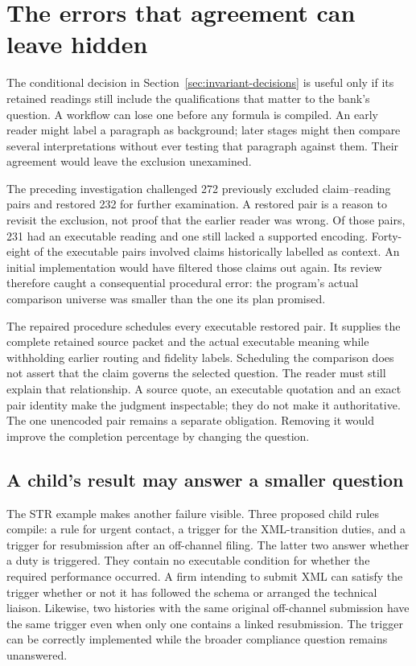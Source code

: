 
\section{The errors that agreement can leave hidden}
\label{sec:executed-assurance}

The conditional decision in Section~\ref{sec:invariant-decisions} is useful only
if its retained readings still include the qualifications that matter to the
bank's question. A workflow can lose one before any formula is compiled. An
early reader might label a paragraph as background; later stages might then
compare several interpretations without ever testing that paragraph against
them. Their agreement would leave the exclusion unexamined.

The preceding investigation challenged 272 previously excluded claim--reading
pairs and restored 232 for further examination. A restored pair is a reason to
revisit the exclusion, not proof that the earlier reader was wrong. Of those
pairs, 231 had an executable reading and one still lacked a supported encoding.
Forty-eight of the executable pairs involved claims historically labelled as
context. An initial implementation would have filtered those claims out again.
Its review therefore caught a consequential procedural error: the program's
actual comparison universe was smaller than the one its plan promised.

The repaired procedure schedules every executable restored pair. It supplies
the complete retained source packet and the actual executable meaning while
withholding earlier routing and fidelity labels. Scheduling the comparison does
not assert that the claim governs the selected question. The reader must still
explain that relationship. A source quote, an executable quotation and an exact
pair identity make the judgment inspectable; they do not make it authoritative.
The one unencoded pair remains a separate obligation. Removing it would improve
the completion percentage by changing the question.

\subsection{A child's result may answer a smaller question}

The STR example makes another failure visible. Three proposed child rules
compile: a rule for urgent contact, a trigger for the XML-transition duties,
and a trigger for resubmission after an off-channel filing. The latter two
answer whether a duty is triggered. They contain no executable condition for
whether the required performance occurred. A firm intending to submit XML can
satisfy the trigger whether or not it has followed the schema or arranged the
technical liaison. Likewise, two histories with the same original off-channel
submission have the same trigger even when only one contains a linked
resubmission. The trigger can be correctly implemented while the broader
compliance question remains unanswered.


